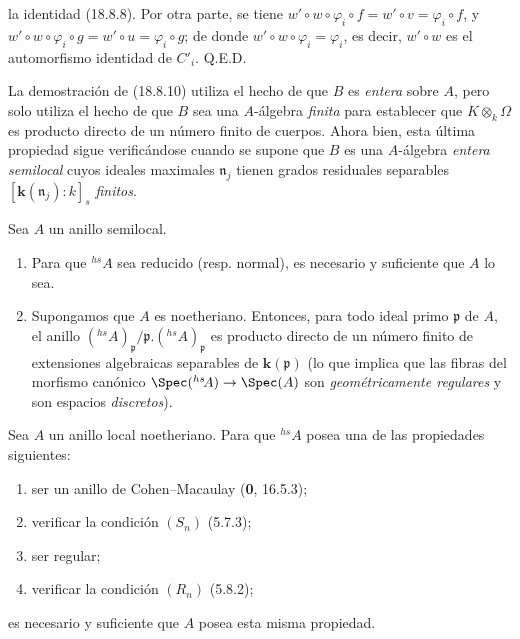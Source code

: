 
la identidad (18.8.8). Por otra parte, se tiene $w'\circ w\circ\varphi_i\circ f=w'\circ v=\varphi_i\circ f$, y $w'\circ w\circ\varphi_i\circ g=w'\circ u=\varphi_i\circ g$; de donde $w'\circ w\circ\varphi_i=\varphi_i$, es decir, $w'\circ w$ es el automorfismo identidad de $C'_i$. Q.E.D.

\begin{remark}[18.8.11]
\label{IV.18.8.11}
La demostración de (18.8.10) utiliza el hecho de que $B$ es \emph{entera} sobre $A$, pero solo utiliza el hecho de que $B$ sea una $A$-álgebra \emph{finita} para establecer que $K\otimes_k\Omega$ es producto directo de un número finito de cuerpos. Ahora bien, esta última propiedad sigue verificándose cuando se supone que $B$ es una $A$-álgebra \emph{entera semilocal} cuyos ideales maximales $\mathfrak n_j$ tienen grados residuales separables $[\boldsymbol{k}(\mathfrak n_j):k]_s$ \emph{finitos}.
\end{remark}

\begin{proposition}[18.8.12]
\label{IV.18.8.12}
Sea $A$ un anillo semilocal.
\begin{enumerate}
  \item[\textup{(i)}] Para que ${}^{hs}\!A$ sea reducido \textup{(resp.} normal\textup{)}, es necesario y suficiente que $A$ lo sea.
  \item[\textup{(ii)}] Supongamos que $A$ es noetheriano. Entonces, para todo ideal primo $\mathfrak p$ de $A$, el anillo $({}^{hs}\!A)_{\mathfrak p}/\mathfrak p.({}^{hs}\!A)_{\mathfrak p}$ es producto directo de un número finito de extensiones algebraicas separables de $\boldsymbol{k}(\mathfrak p)$ \textup{(lo que implica que las fibras del morfismo canónico $\Spec({}^{hs}\!A)\to\Spec(A)$ son \emph{geométricamente regulares} y son espacios \emph{discretos})}.
\end{enumerate}
\end{proposition}

\begin{corollary}[18.8.13]
\label{IV.18.8.13}
Sea $A$ un anillo local noetheriano. Para que ${}^{hs}\!A$ posea una de las propiedades siguientes:
\begin{enumerate}
  \item[\textup{a)}] ser un anillo de Cohen--Macaulay \textup{(\textbf 0, 16.5.3)};
  \item[\textup{b)}] verificar la condición $(S_n)$ \textup{(5.7.3)};
  \item[\textup{c)}] ser regular;
  \item[\textup{d)}] verificar la condición $(R_n)$ \textup{(5.8.2)};
\end{enumerate}
es necesario y suficiente que $A$ posea esta misma propiedad.
\end{corollary}

